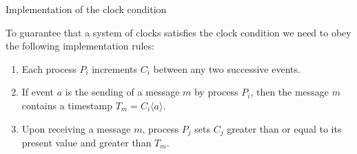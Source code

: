 \documentclass[12pt]{beamer}
\begin{document}
    \begin{frame}{Implementation of the clock condition}
        \begin{lemma}
            To guarantee that a system of clocks satisfies the clock condition we
            need to obey the following implementation rules:
            \begin{enumerate}
                \item Each process \(P_i\) increments \(C_i\) between any two
                successive events.
                \item If event \(a\) is the sending of a message \(m\) by process
                \(P_i\), then the message \(m\) contains a timestamp
                \(T_m = C_i\langle a\rangle\).
                \item Upon receiving a message \(m\), process \(P_j\) sets \(C_j\)
                greater than or equal to its present value and greater than \(T_m\).
            \end{enumerate}
        \end{lemma}
    \end{frame}
\end{document}
